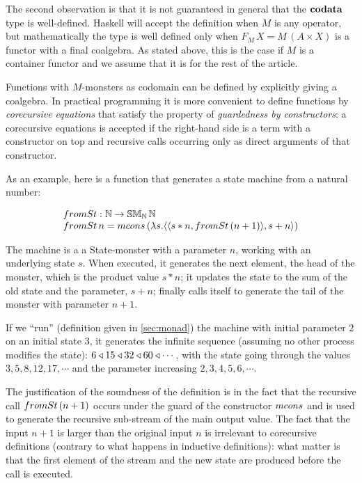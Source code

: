 The second observation is that it is not guaranteed in general that the $\mathbf{codata}$ type is well-defined.
Haskell will accept the definition when $M$ is any operator, but mathematically the type is well defined only when $F_M\,X = M\,(A\times X)$ is a functor with a final coalgebra.
As stated above, this is the case if $M$ is a container functor and we assume that it is for the rest of the article.

Functions with $M$-monsters as codomain can be defined by explicitly giving a coalgebra.
In practical programming it is more convenient to define functions by {\em corecursive equations} that satisfy the property of {\em guardedness by constructors}:
a corecursive equations is accepted if the right-hand side is a term with a constructor on top and recursive calls occurring only as direct arguments of that constructor.

As an example, here is a function that generates a state machine from a natural number:

$$
\begin{array}{l}
\frominc : \nat \rightarrow \stmon{\nat}\,\nat \\
\frominc\, n = \mcons\, (
   \lambda s. \pair{\pair{s*n}{\frominc\, (n + 1)}}{s+n}
                        )
\end{array}
$$

The machine is a  a State-monster with a parameter $n$,
working with an underlying state $s$.
When executed, it generates the next element, the head of the monster, which is the product value $s*n$; it updates the state to the sum of the old state and the parameter, $s+n$; finally calls itself to generate the tail of the monster with parameter $n+1$.

If we ``run'' (definition given in \ref{sec:monad}) the machine with initial parameter $2$ on an initial state $3$,
it generates the infinite sequence (assuming no other process modifies the state): $6 \triangleleft 15 \triangleleft 32 \triangleleft 60 \triangleleft \cdots$, with the state going through the values $3, 5, 8, 12, 17, \cdots$ and the parameter increasing $2, 3, 4, 5, 6, \cdots$.

The justification of the soundness of the definition is in the fact that the recursive call $\frominc\, (n + 1)$ occurs under the guard of the constructor $\mcons $ and is used to generate the recursive sub-stream of the main output value.
The fact that the input $n+1$ is larger than the original input $n$ is irrelevant to corecursive definitions (contrary to what happens in inductive definitions): what matter is that the first element of the stream and the new state are produced before the call is executed.

